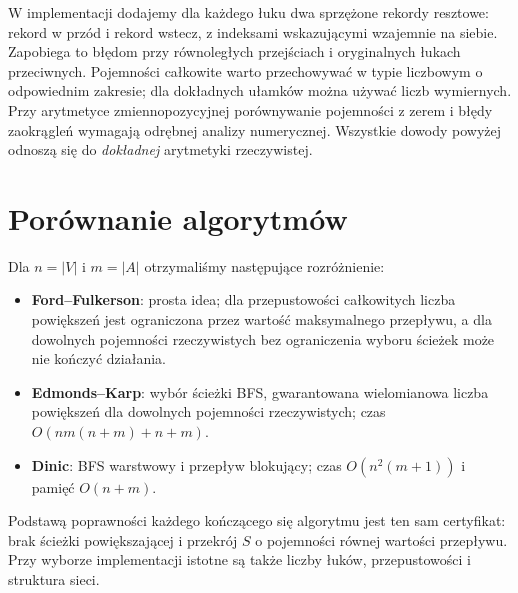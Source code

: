 \begin{uwaga}
W implementacji dodajemy dla każdego łuku
dwa sprzężone rekordy resztowe:
rekord w przód i rekord wstecz,
z indeksami wskazującymi wzajemnie
na siebie. Zapobiega to błędom
przy równoległych przejściach i
oryginalnych łukach przeciwnych.
Pojemności całkowite warto przechowywać
w typie liczbowym o odpowiednim zakresie;
dla dokładnych ułamków można używać
liczb wymiernych. Przy arytmetyce
zmiennopozycyjnej porównywanie
pojemności z zerem i błędy zaokrągleń
wymagają odrębnej analizy numerycznej.
Wszystkie dowody powyżej odnoszą się
do \emph{dokładnej} arytmetyki rzeczywistej.
\end{uwaga}

\section{Porównanie algorytmów}
\label{sec:tg-flow-summary}

Dla $n=|V|$ i $m=|A|$
otrzymaliśmy następujące rozróżnienie:
\begin{itemize}[leftmargin=2em,itemsep=3pt]
\item \textbf{Ford--Fulkerson}: prosta idea;
      dla przepustowości całkowitych
      liczba powiększeń jest ograniczona przez wartość
      maksymalnego przepływu, a dla dowolnych
      pojemności rzeczywistych bez
      ograniczenia wyboru ścieżek
      może nie kończyć działania.
\item \textbf{Edmonds--Karp}: wybór ścieżki BFS,
      gwarantowana wielomianowa liczba
      powiększeń dla dowolnych pojemności
      rzeczywistych; czas
      $O(nm(n+m)+n+m)$.
\item \textbf{Dinic}: BFS warstwowy i
      przepływ blokujący;
      czas $O(n^2(m+1))$
      i pamięć $O(n+m)$.
\end{itemize}

Podstawą poprawności każdego kończącego
się algorytmu jest ten sam certyfikat:
brak ścieżki powiększającej
i przekrój $S$ o pojemności
równej wartości przepływu.
Przy wyborze implementacji
istotne są także liczby łuków,
przepustowości i struktura sieci.

